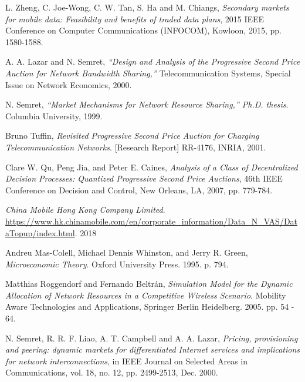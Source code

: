 \documentclass[12pt]{article}
\theoremstyle{definition}
\begin{document}
\begin{thebibliography}{9}

L. Zheng, C. Joe-Wong, C. W. Tan, S. Ha and M. Chiangs, 
\textit{Secondary markets for mobile data: Feasibility and benefits of traded
data plans}, 2015 IEEE
Conference on Computer Communications (INFOCOM), Kowloon, 2015, pp. 1580-1588.

A. A. Lazar and N. Semret, 
\textit{“Design and Analysis of the Progressive Second Price Auction for Network
Bandwidth Sharing,”} Telecommunication Systems, Special Issue on Network Economics, 2000.

N. Semret, 
\textit{“Market Mechanisms for Network Resource Sharing,”
Ph.D. thesis}. 
Columbia University, 1999.

Bruno Tuffin,
\textit{Revisited Progressive Second Price Auction for Charging
Telecommunication Networks}.
[Research Report] RR-4176, INRIA, 2001.

Clare W. Qu, Peng Jia, and Peter E. Caines,
\textit{Analysis of a Class of Decentralized Decision Processes: Quantized
Progressive Second Price Auctions},
46th IEEE Conference on Decision and Control, New Orleans, LA, 2007, pp.
779-784.

\textit{China Mobile Hong Kong Company Limited}.
\url{https://www.hk.chinamobile.com/en/corporate_information/Data_N_VAS/DataTopup/index.html}.
2018

Andreu Mas-Colell, Michael Dennis Whinston, and Jerry R. Green, 
\textit{Microeconomic Theory}. Oxford University Press. 1995. p. 794.

Matthias Roggendorf and Fernando Beltr{\'a}n,
\textit{Simulation Model for the Dynamic Allocation of Network Resources in a
Competitive Wireless Scenario}. Mobility Aware Technologies and Applications, Springer Berlin Heidelberg. 2005.
pp. 54 - 64.

N. Semret, R. R. F. Liao, A. T. Campbell and A. A. Lazar, 
\textit{Pricing, provisioning and peering: dynamic markets for differentiated Internet services and
implications for network interconnections}, in IEEE Journal on Selected Areas in
Communications, vol. 18, no. 12, pp. 2499-2513, Dec. 2000.

\end{thebibliography}
\end{document}
